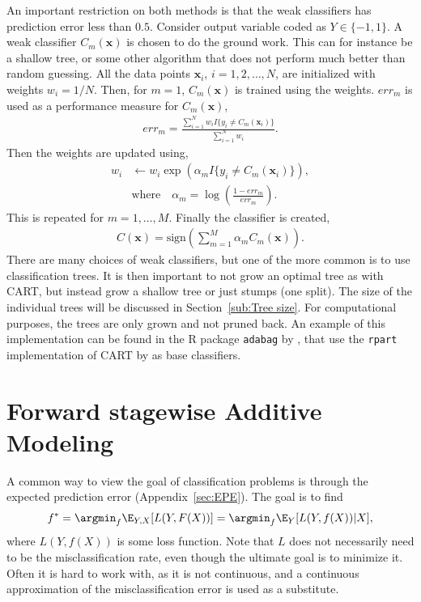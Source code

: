 An important restriction on both methods is that the weak classifiers has prediction error less than $0.5$.
Consider output variable coded as $Y \in \{-1, 1\}$. A weak classifier $C_m(\mathbf{x})$ is chosen to do the ground work. This can for instance be a shallow tree, or some other algorithm that does not perform much better than random guessing. All the data points $\mathbf{x}_i$, $i = 1, 2, \ldots, N$, are initialized with weights $w_i = 1/N$. Then, for $m = 1$, $C_m(\mathbf{x})$ is trained using the weights. $err_m$ is used as a performance measure for $C_m(\mathbf{x})$,
\begin{align}
  err_m =  \frac{\sum^{N}_{i=1} w_i I\{y_i \neq C_m(\mathbf{x}_i)\}}{\sum^{N}_{i=1} w_i}.
\end{align}
Then the weights are updated using, 
\begin{align}
  w_i &\leftarrow w_i \exp\left( \alpha_m I\{y_i \neq C_m(\mathbf{x}_i)\} \right), \\
  &\text{where} \quad \alpha_m = \log\left(  \frac{1-err_m}{err_m} \right).
\end{align}
This is repeated for $m = 1, \ldots, M$. Finally the classifier is created,
\begin{align}
  C( \mathbf{x}) = \text{sign}\left( \sum^{M}_{m=1} \alpha_m C_m(\mathbf{x}) \right).
\end{align}
There are many choices of weak classifiers, but one of the more common is to use classification trees. It is then important to not grow an optimal tree as with CART, but instead grow a shallow tree or just stumps (one split). The size of the individual trees will be discussed in Section~\ref{sub:Tree size}. For computational purposes, the trees are only grown and not pruned back.
An example of this implementation can be found in the R package \verb+adabag+ by \cite{adabag}, that use the \verb+rpart+ implementation of CART by \cite{rpart} as base classifiers.

\section{Forward stagewise Additive Modeling}
\label{sec:Forward stagewise additive modeling}
A common way to view the goal of classification problems is through the expected prediction error (Appendix~\ref{sec:EPE}). The goal is to find
\begin{align}
  \label{eq:fargmin} 
  f^* = \argmin_f \E_{Y, X}[L(Y,F(X))] = \argmin_f \E_Y [L(Y,f(X))|X] ,
\end{align}
where $L(Y, f(X))$ is some loss function. 
Note that $L$ does not necessarily need to be the misclassification rate, even though the ultimate goal is to minimize it.
Often it is hard to work with, as it is not continuous, and a continuous approximation  of the misclassification error is used as a substitute.


